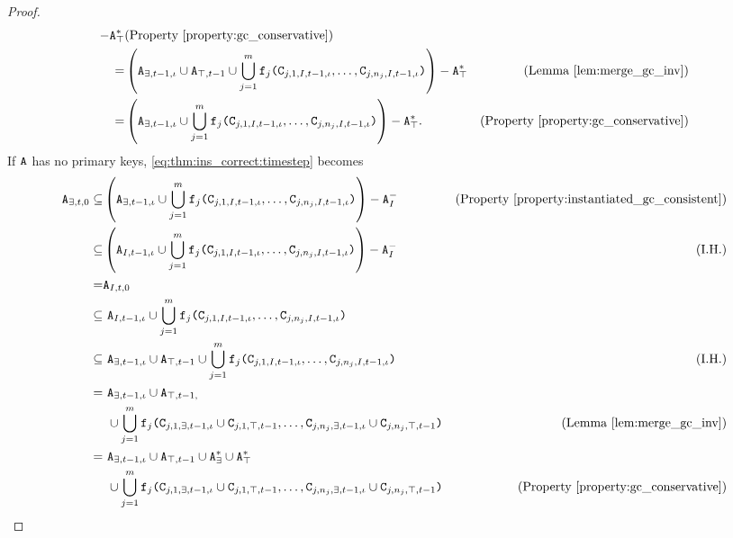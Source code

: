 \documentclass{article}
\numberwithin{equation}{section}
\renewcommand{\tt}[1]{\ifmmode\text{\texttt{#1}}\else\texttt{#1}\fi}
\begin{document}
\begin{proof}
\begin{align}
- \tt{A}_\top^* & \text{(Property \ref{property:gc_conservative})}\nonumber\\
=& \left(\tt{A}_{\exists,t-1,\iota} \cup \tt{A}_{\top,t-1} \cup \bigcup_{j=1}^m \tt{f}_j\tt{(}\tt{C}_{j,1,I,t-1,\iota}, \dots, \tt{C}_{j,n_j,I,t-1,\iota}\tt{)}\right)
- \tt{A}_\top^* & \text{(Lemma \ref{lem:merge_gc_inv})}\nonumber\\
=& \left(\tt{A}_{\exists,t-1,\iota} \cup \bigcup_{j=1}^m \tt{f}_j\tt{(}\tt{C}_{j,1,I,t-1,\iota}, \dots, \tt{C}_{j,n_j,I,t-1,\iota}\tt{)}\right)
- \tt{A}_\top^*. & \text{(Property \ref{property:gc_conservative})} \label{eq:thm:ins_correct:timestep}
\end{align}
If $\tt{A}$ has no primary keys, \eqref{eq:thm:ins_correct:timestep} becomes
\begin{align}
\tt{A}_{\exists,t,0}
\subseteq& \left(\tt{A}_{\exists,t-1,\iota} \cup \bigcup_{j=1}^m \tt{f}_j\tt{(}\tt{C}_{j,1,I,t-1,\iota}, \dots, \tt{C}_{j,n_j,I,t-1,\iota}\tt{)}\right)
- \tt{A}_I^- & \text{(Property \ref{property:instantiated_gc_consistent})} \label{eq:thm:inst_correct:timestep_0}\\
\subseteq& \left(\tt{A}_{I,t-1,\iota} \cup \bigcup_{j=1}^m \tt{f}_j\tt{(}\tt{C}_{j,1,I,t-1,\iota}, \dots, \tt{C}_{j,n_j,I,t-1,\iota}\tt{)}\right)
- \tt{A}_I^- & \text{(I.H.)} \label{eq:thm:inst_correct:timestep_1}\\
=& \tt{A}_{I,t,0} \nonumber\\
\subseteq&~ \tt{A}_{I,t-1,\iota} \cup \bigcup_{j=1}^m \tt{f}_j\tt{(}\tt{C}_{j,1,I,t-1,\iota}, \dots, \tt{C}_{j,n_j,I,t-1,\iota}\tt{)} \nonumber\\
\subseteq&~ \tt{A}_{\exists,t-1,\iota} \cup \tt{A}_{\top,t-1} \cup \bigcup_{j=1}^m \tt{f}_j\tt{(}\tt{C}_{j,1,I,t-1,\iota}, \dots, \tt{C}_{j,n_j,I,t-1,\iota}\tt{)} & \text{(I.H.)} \nonumber\\
=&~ \tt{A}_{\exists,t-1,\iota} \cup \tt{A}_{\top,t-1,} \nonumber\\
&~ \cup \bigcup_{j=1}^m \tt{f}_j\tt{(}\tt{C}_{j,1,\exists,t-1,\iota} \cup \tt{C}_{j,1,\top,t-1}, \dots, \tt{C}_{j,n_j,\exists,t-1,\iota} \cup \tt{C}_{j,n_j,\top,t-1}\tt{)} & \text{(Lemma \ref{lem:merge_gc_inv})} \nonumber\\
=&~ \tt{A}_{\exists,t-1,\iota} \cup \tt{A}_{\top,t-1} \cup \tt{A}_\exists^* \cup \tt{A}_\top^* \nonumber\\
&~ \cup \bigcup_{j=1}^m \tt{f}_j\tt{(}\tt{C}_{j,1,\exists,t-1,\iota} \cup \tt{C}_{j,1,\top,t-1}, \dots, \tt{C}_{j,n_j,\exists,t-1,\iota} \cup \tt{C}_{j,n_j,\top,t-1}\tt{)} & \text{(Property \ref{property:gc_conservative})}\nonumber\\

\end{align}
\end{proof}
\end{document}
